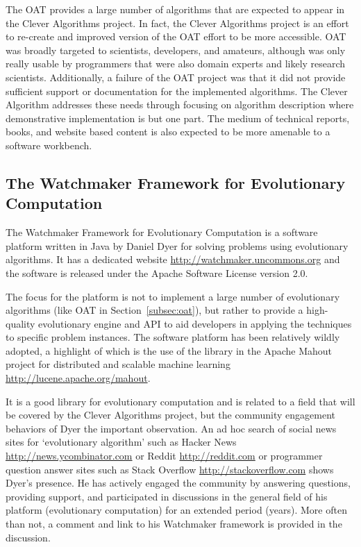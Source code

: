 \documentclass[a4paper, 11pt]{article}
\begin{document}
The OAT provides a large number of algorithms that are expected to appear in the Clever Algorithms project. In fact, the Clever Algorithms project is an effort to re-create and improved version of the OAT effort to be more accessible. OAT was broadly targeted to scientists, developers, and amateurs, although was only really usable by programmers that were also domain experts and likely research scientists. Additionally, a failure of the OAT project was that it did not provide sufficient support or documentation for the implemented algorithms. The Clever Algorithm addresses these needs through focusing on algorithm description where demonstrative implementation is but one part. The medium of technical reports, books, and website based content is also expected to be more amenable to a software workbench.

% 
% 
\subsection{The Watchmaker Framework for Evolutionary Computation}
The Watchmaker Framework for Evolutionary Computation is a software platform written in Java by Daniel Dyer for solving problems using evolutionary algorithms. It has a dedicated website \url{http://watchmaker.uncommons.org} and the software is released under the Apache Software License version 2.0. 

The focus for the platform is not to implement a large number of evolutionary algorithms (like OAT in Section~\ref{subsec:oat}), but rather to provide a high-quality evolutionary engine and API to aid developers in applying the techniques to specific problem instances. The software platform has been relatively wildly adopted, a highlight of which is the use of the library in the Apache Mahout project for distributed and scalable machine learning \url{http://lucene.apache.org/mahout}. 

It is a good library for evolutionary computation and is related to a field that will be covered by the Clever Algorithms project, but the community engagement behaviors of Dyer the important observation. An ad hoc search of social news sites for `evolutionary algorithm' such as Hacker News \url{http://news.ycombinator.com} or Reddit \url{http://reddit.com} or programmer question answer sites such as Stack Overflow \url{http://stackoverflow.com} shows Dyer's presence. He has actively engaged the community by answering questions, providing support, and participated in discussions in the general field of his platform (evolutionary computation) for an extended period (years). More often than not, a comment and link to his Watchmaker framework is provided in the discussion. 
\end{document}

